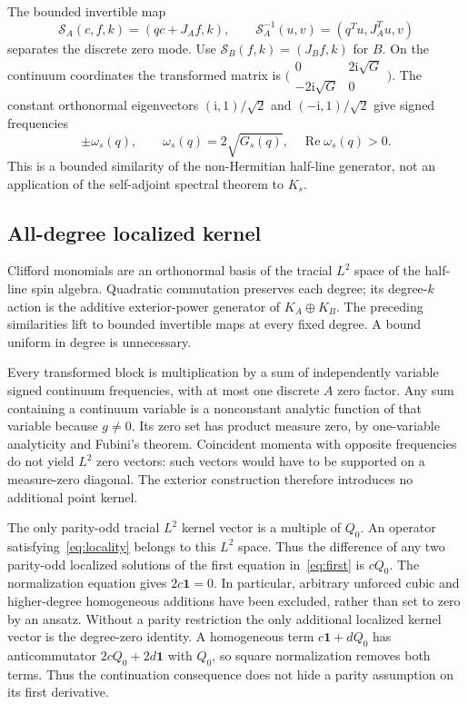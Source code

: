 \documentclass[11pt,a4paper]{article}
\newcommand{\ii}{\mathrm{i}}
\newcommand{\Id}{\mathbf{1}}
\newcommand{\Rea}{\operatorname{Re}}
\begin{document}
The bounded invertible map
\begin{equation}
 \mathcal S_A(c,f,k)=(qc+J_Af,k),\qquad
 \mathcal S_A^{-1}(u,v)=(q^Tu,J_A^Tu,v)\label{eq:similarity}
\end{equation}
separates the discrete zero mode. Use $\mathcal S_B(f,k)=(J_Bf,k)$
for $B$. On the continuum coordinates the transformed matrix is
$\bigl(\begin{smallmatrix}0&2\ii\sqrt G\\-2\ii\sqrt G&0\end{smallmatrix}\bigr)$.
The constant orthonormal eigenvectors $(\ii,1)/\sqrt2$ and
$(-\ii,1)/\sqrt2$ give signed frequencies
\begin{equation}
 \pm\omega_s(q),\qquad \omega_s(q)=2\sqrt{G_s(q)},\quad
 \Rea\omega_s(q)>0.\label{eq:frequency}
\end{equation}
This is a bounded similarity of the non-Hermitian half-line generator, not
an application of the self-adjoint spectral theorem to $K_s$.

\subsection{All-degree localized kernel}
Clifford monomials are an orthonormal basis of the tracial $L^2$ space of
the half-line spin algebra. Quadratic commutation preserves each degree;
its degree-$k$ action is the additive exterior-power generator of $K_A\oplus
K_B$. The preceding similarities lift to bounded invertible maps at every
fixed degree. A bound uniform in degree is unnecessary.

Every transformed block is multiplication by a sum of independently
variable signed continuum frequencies, with at most one discrete $A$ zero
factor. Any sum containing a continuum variable is a nonconstant analytic
function of that variable because $g\ne0$. Its zero set has product measure
zero, by one-variable analyticity and Fubini's theorem. Coincident momenta
with opposite frequencies do not yield $L^2$ zero vectors: such vectors
would have to be supported on a measure-zero diagonal. The exterior
construction therefore introduces no additional point kernel.

The only parity-odd tracial $L^2$ kernel vector is a multiple of $Q_0$.
An operator satisfying~\eqref{eq:locality} belongs to this $L^2$ space.
Thus the difference of any two parity-odd localized solutions of the first
equation in~\eqref{eq:first} is $cQ_0$. The normalization equation gives
$2c\Id=0$. In particular, arbitrary unforced cubic and higher-degree
homogeneous additions have been excluded, rather than set to zero by an
ansatz.
Without a parity restriction the only additional localized kernel vector
is the degree-zero identity. A homogeneous term $c\Id+dQ_0$ has
anticommutator $2cQ_0+2d\Id$ with $Q_0$, so square normalization removes
both terms. Thus the continuation consequence does not hide a parity
assumption on its first derivative.
\end{document}
